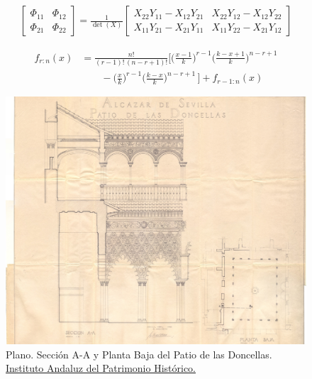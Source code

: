 \lipsum[31-32]

\begin{gather}
    \begin{bmatrix} \Phi_{11} & \Phi_{12} \\ \Phi_{21} & \Phi_{22} \end{bmatrix}
    =
    \frac{1}{\det(X)}
     \begin{bmatrix}
      X_{22} Y_{11} - X_{12} Y_{21} &
      X_{22} Y_{12} - X_{12} Y_{22} \\
      X_{11} Y_{21} - X_{21} Y_{11} &
      X_{11} Y_{22} - X_{21} Y_{12} 
      \end{bmatrix}
   \end{gather}

\lipsum[33-34]

\begin{equation}
    \begin{split}
    f_{r:n}(x)&=\frac{n!}{(r-1)!\,(n-r+1)!}
       \Biggl[ \biggl( \frac{x-1}{k}  \biggr)^{\!r-1} 
               \biggl( \frac{k-x+1}{k}\biggr)^{\!n-r+1} \\
      &\qquad -\biggl( \frac{x}{k}    \biggr)^{\!r-1} 
               \biggl( \frac{k-x}{k}  \biggr)^{\!n-r+1} \,
       \Biggr]+ f_{r-1:n}(x)                    
    \end{split}
\end{equation}


\begin{landscape}
    \begin{figure}[p]
        \centering
        \includegraphics[width=0.69\linewidth]{figures/examples/example5.jpg}
        \caption[Plano. Sección A-A y Planta Baja del Patio de las Doncellas.]{Plano. Sección A-A y Planta Baja del Patio de las Doncellas. \href{https://hdl.handle.net/11532/333959}{Instituto Andaluz del Patrimonio Histórico.}}
        \label{fig:drawing-doncellas}
    \end{figure}
\end{landscape}

\lipsum[45-44]
